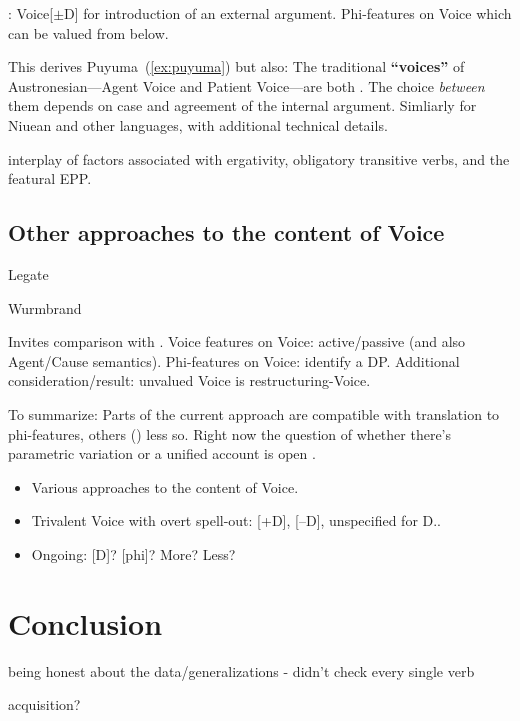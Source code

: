 \pex \cite{nie17}:
	\a Voice{[}$\pm$D] for introduction of an external argument.
	\a Phi-features on Voice which can be valued from below.
\xe

\pex This derives Puyuma~(\ref{ex:puyuma}) but also:
	\a The traditional \textbf{``voices''} of Austronesian---Agent Voice and Patient Voice---are both {\vd}. The choice \emph{between} them depends on case and agreement of the internal argument.
	\a Simliarly for Niuean and other languages, with additional technical details.
\xe


interplay of factors associated with ergativity, obligatory transitive verbs, and the featural EPP.

	\subsection{Other approaches to the content of Voice} \label{i:agree:other}
Legate

Wurmbrand

\pex Invites comparison with \cite{wurmbrandshimamura17}.
	\a Voice features on Voice: active/passive (and also Agent/Cause semantics). %
	\a Phi-features on Voice: identify a DP.
	\a Additional consideration/result: unvalued Voice is restructuring-Voice.
\xe

\pex To summarize:
	\a Parts of the current approach are compatible with translation to phi-features, others (\vz) less so.
	\a Right now the question of whether there's parametric variation or a unified account is open \citep[191ff12]{wurmbrandshimamura17}.
\xe

\begin{itemize}
	\item Various approaches to the content of Voice.
	\item Trivalent Voice with overt spell-out: [+D], [--D], unspecified for D..
	\item Ongoing: [D]? [phi]? More? Less?
\end{itemize}


\section{Conclusion} \label{i:conc}

being honest about the data/generalizations - didn't check every single verb

acquisition?


